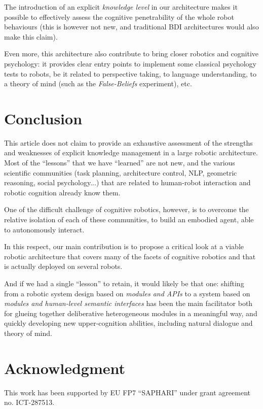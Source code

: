 \documentclass[letterpaper, 10 pt, conference]{ieeeconf}  %
\begin{document}
The introduction of an explicit \emph{knowledge level} in our architecture
makes it possible to effectively assess the cognitive penetrability of the
whole robot behaviours (this is however not new, and traditional BDI
architectures would also make this claim).

Even more, this architecture also contribute to bring closer robotics and
cognitive psychology: it provides clear entry points to implement some
classical psychology tests to robots, be it related to perspective taking, to
language understanding, to a theory of mind (such as the \emph{False-Beliefs}
experiment), etc.

\section{Conclusion}

This article does not claim to provide an exhaustive assessment of the
strengths and weaknesses of explicit knowledge management in a large robotic
architecture. Most of the ``lessons'' that we have ``learned'' are not new, and
the various scientific communities (task planning, architecture control, NLP,
geometric reasoning, social psychology...) that are related to human-robot
interaction and robotic cognition already know them.

One of the difficult challenge of cognitive robotics, however, is to overcome
the relative isolation of each of these communities, to build an embodied
agent, able to autonomously interact.

In this respect, our main contribution is to propose a critical look at a
viable robotic architecture that covers many of the facets of cognitive
robotics and that is actually deployed on several robots.

And if we had a single ``lesson'' to retain, it would likely be that one:
shifting from a robotic system design based on \emph{modules and APIs} to a
system based on \emph{modules and human-level semantic interfaces} has been the
main facilitator both for glueing together deliberative heterogeneous modules
in a meaningful way, and quickly developing new upper-cognition abilities,
including natural dialogue and theory of mind.



\section*{Acknowledgment}

This work has been supported by EU FP7 ``SAPHARI'' under grant agreement no. ICT-287513.



\end{document}
